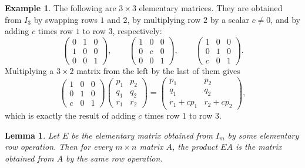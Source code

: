 \documentclass[11pt]{article}
\theoremstyle{definition}
\newtheorem{example}[definition]{Example}
\theoremstyle{plain}
\newtheorem{lemma}[definition]{Lemma}
\theoremstyle{remark}
\begin{document}
\begin{example}
    The following are $3 \times 3$ elementary matrices. They are obtained from $I_3$ by swapping rows $1$ and $2$, by multiplying row $2$ by a scalar $c \neq 0$, and by adding $c$ times row $1$ to row $3$, respectively:
    \[\begin{pmatrix}
        0 & 1 & 0 \\
        1 & 0 & 0 \\
        0 & 0 & 1
    \end{pmatrix}, \qquad \begin{pmatrix}
        1 & 0 & 0 \\
        0 & c & 0 \\
        0 & 0 & 1
    \end{pmatrix}, \qquad \begin{pmatrix}
        1 & 0 & 0 \\
        0 & 1 & 0 \\
        c & 0 & 1
    \end{pmatrix}.\]
    Multiplying a $3 \times 2$ matrix from the left by the last of them gives
    \[\begin{pmatrix}
        1 & 0 & 0 \\
        0 & 1 & 0 \\
        c & 0 & 1
    \end{pmatrix} \begin{pmatrix}
        p_1 & p_2 \\
        q_1 & q_2 \\
        r_1 & r_2
    \end{pmatrix} = \begin{pmatrix}
        p_1 & p_2 \\
        q_1 & q_2 \\
        r_1 + c p_1 & r_2 + c p_2
    \end{pmatrix},\]
    which is exactly the result of adding $c$ times row $1$ to row $3$.
\end{example}

\begin{lemma}\label{lem:elementary}
    Let $E$ be the elementary matrix obtained from $I_m$ by some elementary row operation. Then for every $m \times n$ matrix $A$, the product $EA$ is the matrix obtained from $A$ by the same row operation.
\end{lemma}
\end{document}
